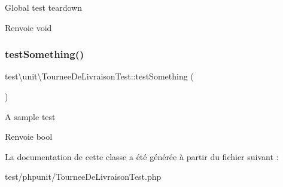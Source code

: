 Global test teardown \begin{DoxyReturn}{Renvoie}
void 
\end{DoxyReturn}
\mbox{\label{classtest_1_1unit_1_1TourneeDeLivraisonTest_a11021bb8e3d72b1f9ff4d0e1d7487a99}} 
\subsubsection{\texorpdfstring{test\+Something()}{testSomething()}}
{\footnotesize\ttfamily test\textbackslash{}unit\textbackslash{}\+Tournee\+De\+Livraison\+Test\+::test\+Something (\begin{DoxyParamCaption}{ }\end{DoxyParamCaption})}

A sample test \begin{DoxyReturn}{Renvoie}
bool 
\end{DoxyReturn}


La documentation de cette classe a été générée à partir du fichier suivant \+:\begin{DoxyCompactItemize}
\item 
test/phpunit/Tournee\+De\+Livraison\+Test.\+php\end{DoxyCompactItemize}
